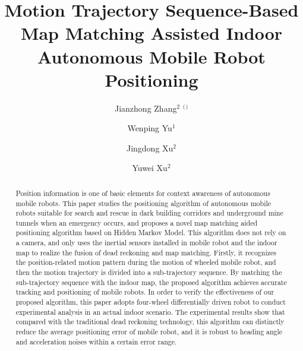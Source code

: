 \documentclass{llncs}
\begin{document}
%
\title{Motion Trajectory Sequence-Based Map Matching Assisted Indoor Autonomous Mobile Robot Positioning}
%

\author{Jianzhong Zhang$^2$ $^($\Envelope$^)$ \and Wenping Yu$^1$ \and Jingdong Xu$^2$ \and Yuwei Xu$^2$}
%
%
%


\maketitle              %

\begin{abstract}

Position information is one of basic elements for context awareness of autonomous mobile robots. This paper studies the positioning algorithm of autonomous mobile robots suitable for search and rescue in dark building corridors and underground mine tunnels when an emergency occurs, and proposes a novel map matching aided positioning algorithm based on Hidden Markov Model. This algorithm does not rely on a camera, and only uses the inertial sensors installed in mobile robot and the indoor map to realize the fusion of dead reckoning and map matching. Firstly, it recognizes the position-related motion pattern during the motion of wheeled mobile robot, and then the motion trajectory is divided into a sub-trajectory sequence. By matching the sub-trajectory sequence with the indoor map, the proposed algorithm achieves accurate tracking and positioning of mobile robots. In order to verify the effectiveness of our proposed algorithm, this paper adopts four-wheel differentially driven robot to conduct experimental analysis in an actual indoor scenario. The experimental results show that compared with the traditional dead reckoning technology, this algorithm can distinctly reduce the average positioning error of mobile robot, and it is robust to heading angle and acceleration noises within a certain error range.

\end{abstract}
%
\end{document}
